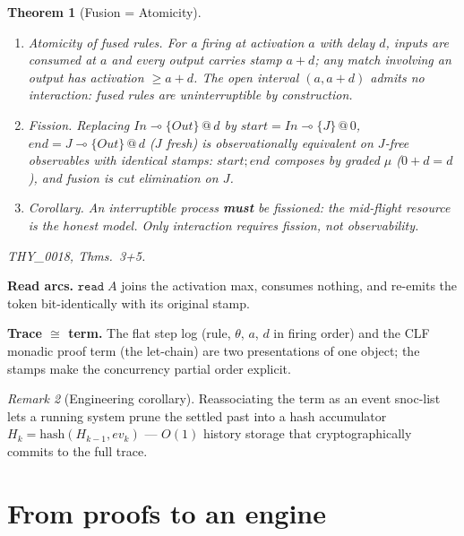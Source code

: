 \documentclass[11pt]{article}
\makeatletter
\newcommand{\lax}[2]{\{#1\}\mathbin{@}#2}       %
\newcommand{\loli}{\multimap}                    %
\newtheorem{theorem}{Theorem}[section]
\theoremstyle{definition}
\theoremstyle{remark}
\newtheorem{remark}[theorem]{Remark}
\makeatother
\begin{document}
\begin{theorem}[Fusion = Atomicity]
\label{thm:fusion}
\begin{enumerate}
\item[(a)] \emph{Atomicity of fused rules.}  For a firing at activation $a$ with
  delay $d$, inputs are consumed at $a$ and every output carries stamp $a+d$; any
  match involving an output has activation $\geq a+d$.  The open interval
  $(a, a{+}d)$ admits no interaction: fused rules are uninterruptible by
  construction.
\item[(b)] \emph{Fission.}  Replacing $\mathit{In} \loli \lax{\mathit{Out}}{d}$
  by $\mathit{start} = \mathit{In} \loli \lax{J}{0}$, $\mathit{end} = J \loli
  \lax{\mathit{Out}}{d}$ ($J$ fresh) is observationally equivalent on $J$-free
  observables with identical stamps: $\mathit{start};\mathit{end}$ composes by
  graded $\mu$ ($0+d = d$), and fusion is cut elimination on $J$.
\item[(c)] \emph{Corollary.}  An interruptible process \textbf{must} be fissioned:
  the mid-flight resource is the honest model.  Only \emph{interaction}
  requires fission, not observability.
\end{enumerate}
THY\_0018, Thms.~3+5.
\end{theorem}

\medskip
\noindent\textbf{Read arcs.}  $\mathtt{read}\;A$ joins the activation max,
consumes nothing, and re-emits the token bit-identically with its original stamp.

\medskip
\noindent\textbf{Trace $\cong$ term.}  The flat step log (rule, $\theta$, $a$, $d$
in firing order) and the CLF monadic proof term (the let-chain) are two
presentations of one object; the stamps make the concurrency partial order
explicit.

\begin{remark}[Engineering corollary]
\label{rem:hash-accum}
Reassociating the term as an event snoc-list lets a running system prune the
settled past into a hash accumulator $H_k = \mathrm{hash}(H_{k-1}, \mathit{ev}_k)$
--- $O(1)$ history storage that cryptographically commits to the full trace.
\end{remark}

\section{From proofs to an engine}
\label{sec:engine}
\end{document}
